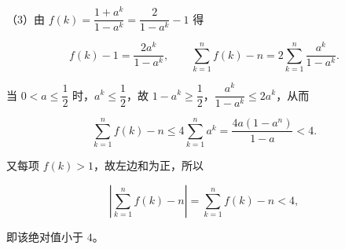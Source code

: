 \begin{answer}
（3）由 $f(k)=\dfrac{1+a^k}{1-a^k}=\dfrac{2}{1-a^k}-1$ 得

\nopagebreak[4]
\[f(k)-1=\frac{2a^k}{1-a^k},\qquad \sum_{k=1}^nf(k)-n=2\sum_{k=1}^n\frac{a^k}{1-a^k}.\]

当 $0<a\leqslant\dfrac12$ 时，$a^k\leqslant\dfrac12$，故 $1-a^k\geqslant\dfrac12$，$\dfrac{a^k}{1-a^k}\leqslant2a^k$，从而

\nopagebreak[4]
\[\sum_{k=1}^nf(k)-n\leqslant4\sum_{k=1}^na^k=\frac{4a\left(1-a^n\right)}{1-a}<4.\]

又每项 $f(k)>1$，故左边和为正，所以

\nopagebreak[4]
\[\left|\sum_{k=1}^nf(k)-n\right|=\sum_{k=1}^nf(k)-n<4,\]

即该绝对值小于 $4$。


\end{answer}